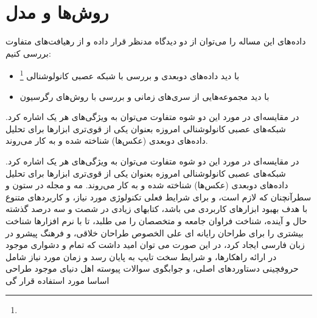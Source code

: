 \chapter{روش‌ها و مدل}
\thispagestyle{empty}
\noindent
\vskip 2cm


داده‌های این مساله را می‌توان از دو دیدگاه مدنظر قرار داده و از رهیافت‌های متفاوت بررسی کنیم:
\begin{itemize}
	\item با دید داده‌های دوبعدی و بررسی با شبکه عصبی کانولوشنالی
		\footnote{} 
	\item با دید مجموعه‌هایی از سری‌های زمانی و بررسی با روش‌های رگرسیون  
\end{itemize}
در مقایسه‌ای در مورد این دو شوه متفاوت می‌توان به ویژگی‌های هر یک اشاره کرد. شبکه‌‌های عصبی کانولوشنالی امروزه بعنوان یکی از قوی‌تری ابزارها برای تحلیل داده‌های دوبعدی (عکس‌ها) شناخته شده و به کار می‌روند. 

\cite{Khadiev2019a}در مقایسه‌ای در مورد این دو شوه متفاوت می‌توان به ویژگی‌های هر یک اشاره کرد. شبکه‌‌های عصبی کانولوشنالی امروزه بعنوان یکی از قوی‌تری ابزارها برای تحلیل داده‌های دوبعدی (عکس‌ها) شناخته شده و به کار می‌روند. 
مه و مجله در ستون و سطرآنچنان که لازم است، و برای شرایط فعلی تکنولوژی مورد نیاز، و کاربردهای متنوع با هدف بهبود ابزارهای کاربردی می باشد، کتابهای زیادی در شصت و سه درصد گذشته حال و آینده، شناخت فراوان جامعه و متخصصان را می طلبد، تا با نرم افزارها شناخت بیشتری را برای طراحان رایانه ای علی الخصوص طراحان خلاقی، و فرهنگ پیشرو در زبان فارسی ایجاد کرد، در این صورت می توان امید داشت که تمام و دشواری موجود در ارائه راهکارها، و شرایط سخت تایپ به پایان رسد و زمان مورد نیاز شامل حروفچینی دستاوردهای اصلی، و جوابگوی سوالات پیوسته اهل دنیای موجود طراحی اساسا مورد استفاده قرار گی